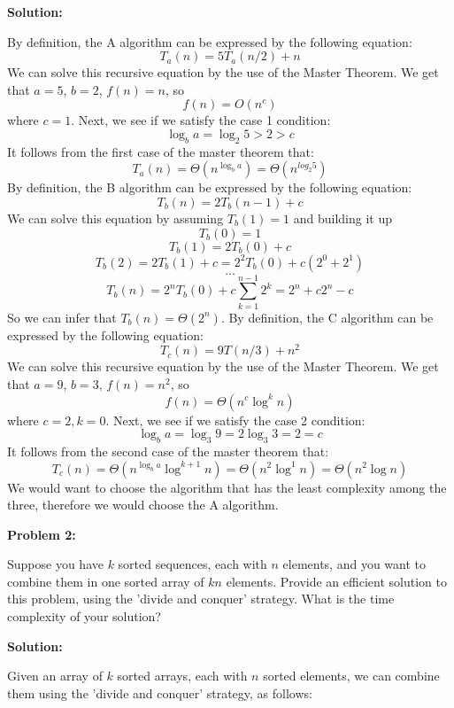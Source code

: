 \documentclass[12pt]{article}
\begin{document}
\begin{center}
\textbf{Solution:}
\end{center}
By definition, the A algorithm can be expressed by the following equation: $$T_a(n) = 5T_a(n/2)+n$$ We can solve this recursive equation by the use of the Master Theorem. 
We get that $a = 5$, $b = 2$, $f(n) = n$, so $$f(n) = O(n^c)$$ where $c = 1$. Next, we see if we satisfy the case 1 condition: $$\log_b a = \log_2 5 > 2 > c$$ It follows from the first case of the master theorem that: $$T_a(n) = \Theta(n^{\log_b a}) = \Theta(n^{log_2 5})$$
\newline
By definition, the B algorithm can be expressed by the following equation: $$T_b(n) = 2T_b(n-1)+c$$ We can solve this equation by assuming $T_b(1) = 1$ and building it up $$T_b(0)  = 1$$ $$T_b(1) = 2T_b(0) + c$$ $$T_b(2) = 2T_b(1) + c = 2^2T_b(0) + c(2^0 + 2^1)$$ $$ ... $$ $$T_b(n) = 2^{n}T_b(0) + c\sum_{k=1}^{n-1} 2^k = 2^{n} + c2^{n}-c$$ So we can infer that $T_b(n) = \Theta(2^n)$.
\newline
By definition, the C algorithm can be expressed by the following equation: $$T_c(n) = 9T(n/3) + n^2$$ We can solve this recursive equation by the use of the Master Theorem. We get that $a = 9$, $b = 3$, $f(n) = n^2$, so $$f(n) = \Theta(n^c\log^k n)$$ where $c = 2, k = 0$. Next, we see if we satisfy the case 2 condition: $$\log_b a = \log_3 9 = 2\log_3 3 = 2 = c$$ It follows from the second case of the master theorem that: $$T_c(n) = \Theta(n^{\log_b a}\log^{k+1} n) = \Theta(n^2\log^1 n) = \Theta(n^2\log n)$$
\newline
We would want to choose the algorithm that has the least complexity among the three, therefore we would choose the A algorithm.


\begin{center}
\textbf{Problem 2:}
\end{center}
Suppose you have $k$ sorted sequences, each with $n$ elements, and you want to combine them in one sorted array of $kn$ elements. Provide an efficient solution to this problem, using the 'divide and conquer' strategy. What is the time complexity of your solution?
\newline
\newline

\begin{center}
\textbf{Solution:}
\end{center}
Given an array of $k$ sorted arrays, each with $n$ sorted elements, we can combine them using the 'divide and conquer' strategy, as follows: 
\end{document}
